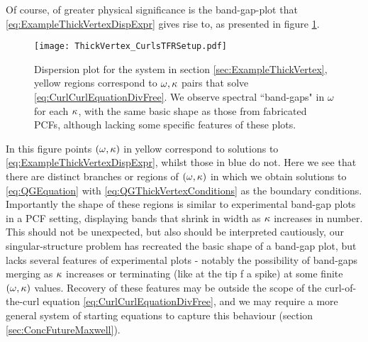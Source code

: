 Of course, of greater physical significance is the band-gap-plot that \eqref{eq:ExampleThickVertexDispExpr} gives rise to, as presented in figure \ref{fig:ThickVertex_CurlsTFRSetup}.
\begin{figure}[b!]
	\centering
	\texttt{[image: ThickVertex\_CurlsTFRSetup.pdf]}
	\caption{\label{fig:ThickVertex_CurlsTFRSetup} Dispersion plot for the system in section \ref{sec:ExampleThickVertex}, yellow regions correspond to $\omega, \kappa$ pairs that solve \eqref{eq:CurlCurlEquationDivFree}. We observe spectral ``band-gaps" in $\omega$ for each $\kappa$, with the same basic shape as those from fabricated PCFs, although lacking some specific features of these plots.}
\end{figure}
In this figure points $\left( \omega, \kappa \right)$ in yellow correspond to solutions to \eqref{eq:ExampleThickVertexDispExpr}, whilst those in blue do not.
Here we see that there are distinct branches or regions of $\left( \omega, \kappa \right)$ in which we obtain solutions to \eqref{eq:QGEquation} with \eqref{eq:QGThickVertexConditions} as the boundary conditions.
Importantly the shape of these regions is similar to experimental band-gap plots in a PCF setting, displaying bands that shrink in width as $\kappa$ increases in number.
This should not be unexpected, but also should be interpreted cautiously, our singular-structure problem has recreated the basic shape of a band-gap plot, but lacks several features of experimental plots - notably the possibility of band-gaps merging as $\kappa$ increases or terminating (like at the tip f a spike) at some finite $\left( \omega, \kappa \right)$ values.
Recovery of these features may be outside the scope of the curl-of-the-curl equation \eqref{eq:CurlCurlEquationDivFree}, and we may require a more general system of starting equations to capture this behaviour (section \ref{sec:ConcFutureMaxwell}).

